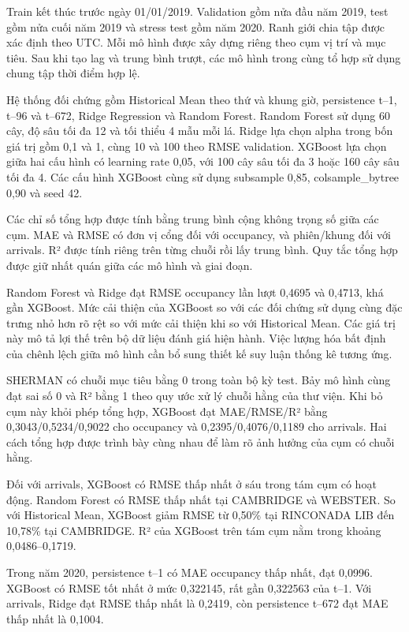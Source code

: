 \documentclass[conference,a4paper]{IEEEtran}
\begin{document}
Train kết thúc trước ngày 01/01/2019. Validation gồm nửa đầu năm 2019, test gồm nửa cuối năm 2019 và stress test gồm năm 2020. Ranh giới chia tập được xác định theo UTC. Mỗi mô hình được xây dựng riêng theo cụm vị trí và mục tiêu. Sau khi tạo lag và trung bình trượt, các mô hình trong cùng tổ hợp sử dụng chung tập thời điểm hợp lệ.

Hệ thống đối chứng gồm Historical Mean theo thứ và khung giờ, persistence t–1, t–96 và t–672, Ridge Regression và Random Forest. Random Forest sử dụng 60 cây, độ sâu tối đa 12 và tối thiểu 4 mẫu mỗi lá. Ridge lựa chọn alpha trong bốn giá trị gồm 0,1 và 1, cùng 10 và 100 theo RMSE validation. XGBoost lựa chọn giữa hai cấu hình có learning rate 0,05, với 100 cây sâu tối đa 3 hoặc 160 cây sâu tối đa 4. Các cấu hình XGBoost cùng sử dụng subsample 0,85, colsample\_bytree 0,90 và seed 42.

Các chỉ số tổng hợp được tính bằng trung bình cộng không trọng số giữa các cụm. MAE và RMSE có đơn vị cổng đối với occupancy, và phiên/khung đối với arrivals. R² được tính riêng trên từng chuỗi rồi lấy trung bình. Quy tắc tổng hợp được giữ nhất quán giữa các mô hình và giai đoạn.

Random Forest và Ridge đạt RMSE occupancy lần lượt 0,4695 và 0,4713, khá gần XGBoost. Mức cải thiện của XGBoost so với các đối chứng sử dụng cùng đặc trưng nhỏ hơn rõ rệt so với mức cải thiện khi so với Historical Mean. Các giá trị này mô tả lợi thế trên bộ dữ liệu đánh giá hiện hành. Việc lượng hóa bất định của chênh lệch giữa mô hình cần bổ sung thiết kế suy luận thống kê tương ứng.

SHERMAN có chuỗi mục tiêu bằng 0 trong toàn bộ kỳ test. Bảy mô hình cùng đạt sai số 0 và R² bằng 1 theo quy ước xử lý chuỗi hằng của thư viện. Khi bỏ cụm này khỏi phép tổng hợp, XGBoost đạt MAE/RMSE/R² bằng 0,3043/0,5234/0,9022 cho occupancy và 0,2395/0,4076/0,1189 cho arrivals. Hai cách tổng hợp được trình bày cùng nhau để làm rõ ảnh hưởng của cụm có chuỗi hằng.

Đối với arrivals, XGBoost có RMSE thấp nhất ở sáu trong tám cụm có hoạt động. Random Forest có RMSE thấp nhất tại CAMBRIDGE và WEBSTER. So với Historical Mean, XGBoost giảm RMSE từ 0,50\% tại RINCONADA LIB đến 10,78\% tại CAMBRIDGE. R² của XGBoost trên tám cụm nằm trong khoảng 0,0486–0,1719.

Trong năm 2020, persistence t–1 có MAE occupancy thấp nhất, đạt 0,0996. XGBoost có RMSE tốt nhất ở mức 0,322145, rất gần 0,322563 của t–1. Với arrivals, Ridge đạt RMSE thấp nhất là 0,2419, còn persistence t–672 đạt MAE thấp nhất là 0,1004.
\end{document}
